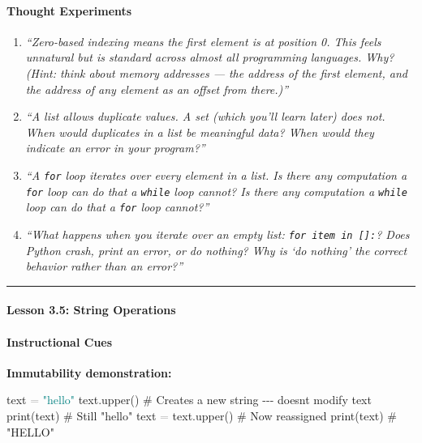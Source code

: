 \documentclass[
  justified,
  openright,
]{tufte-book}
\let\subsubsection\paragraph
\let\paragraph\paragraph
\newcommand{\BuiltInTok}[1]{#1}
\newcommand{\CommentTok}[1]{\textcolor{MidGray}{#1}}
\newcommand{\NormalTok}[1]{#1}
\newcommand{\OperatorTok}[1]{\textcolor{DarkGray}{#1}}
\newcommand{\StringTok}[1]{\textcolor{Teal}{#1}}
\newenvironment{Shaded}{%
  \begin{snugshade}
}{%
  \end{snugshade}
}
\let\subsubsection\paragraph
\let\paragraph\paragraph
\begin{document}
\paragraph{Thought Experiments}\label{thought-experiments-10}

\begin{enumerate}
\def\labelenumi{\arabic{enumi}.}
\item
  \emph{``Zero-based indexing means the first element is at position 0.
  This feels unnatural but is standard across almost all programming
  languages. Why? (Hint: think about memory addresses --- the address of
  the first element, and the address of any element as an offset from
  there.)''}
\item
  \emph{``A list allows duplicate values. A set (which you'll learn
  later) does not. When would duplicates in a list be meaningful data?
  When would they indicate an error in your program?''}
\item
  \emph{``A \texttt{for} loop iterates over every element in a list. Is
  there any computation a \texttt{for} loop can do that a \texttt{while}
  loop cannot? Is there any computation a \texttt{while} loop can do
  that a \texttt{for} loop cannot?''}
\item
  \emph{``What happens when you iterate over an empty list:
  \texttt{for\ item\ in\ {[}{]}:}? Does Python crash, print an error, or
  do nothing? Why is `do nothing' the correct behavior rather than an
  error?''}
\end{enumerate}

\begin{center}\rule{0.5\linewidth}{0.5pt}\end{center}

\subsubsection{Lesson 3.5: String
Operations}\label{lesson-3.5-string-operations}

\paragraph{Instructional Cues}\label{instructional-cues-9}

\textbf{Immutability demonstration:}

\begin{Shaded}
\begin{Highlighting}[]
\NormalTok{text }\OperatorTok{=} \StringTok{"hello"}
\NormalTok{text.upper()        }\CommentTok{\# Creates a new string {-}{-}{-} doesn\textquotesingle{}t modify text}
\BuiltInTok{print}\NormalTok{(text)         }\CommentTok{\# Still "hello"}
\NormalTok{text }\OperatorTok{=}\NormalTok{ text.upper() }\CommentTok{\# Now reassigned}
\BuiltInTok{print}\NormalTok{(text)         }\CommentTok{\# "HELLO"}
\end{Highlighting}
\end{Shaded}
\end{document}
